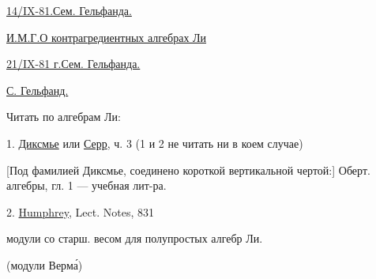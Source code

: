 \underline{14/IX-81.}\qquad \underline{Сем. Гельфанда.}

\underline{И.М.Г.}\quad \underline{О контрагредиентных алгебрах Ли}

\underline{21/IX-81 г.}\qquad \underline{Сем. Гельфанда.}

\underline{С. Гельфанд.}

Читать по алгебрам Ли:

1. \underline{Диксмье} или \underline{Серр}, ч. 3 (1 и 2 не читать ни в коем случае)

[Под фамилией Диксмье, соединено короткой вертикальной чертой:] Оберт. алгебры, гл. 1 --- учебная лит-ра.

2. \underline{Humphrey}, Lect. Notes, 831

модули со старш. весом для полупростых алгебр Ли.

(модули Верма́)

